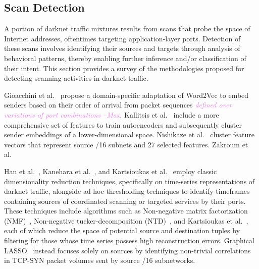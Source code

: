\documentclass[manuscript,nonacm]{acmart}
\newcommand{\maxnote}[1]{\textit{\textcolor{violet}{#1 --Max}}}
\begin{document}

\label{sec:methods:scan}
\subsection{Scan Detection}

A portion of darknet traffic mixtures results from scans that probe the space of Internet addresses, oftentimes targeting application-layer ports.
Detection of these scans involves identifying their sources and targets through analysis of behavioral patterns, thereby enabling further inference and/or classification of their intent.
This section provides a survey of the methodologies proposed for detecting scanning activities in darknet traffic. 

Gioacchini et al.~\cite{2021gioacchini,2023gioacchini} propose a domain-specific adaptation of Word2Vec to embed senders based on their order of arrival from packet sequences \maxnote{defined over variations of port combinations}.
Kallitsis et al.~\cite{2022kallitsis} include a more comprehensive set of features to train autoencoders and subsequently cluster sender embeddings of a lower-dimensional space. 
Nishikaze et al.~\cite{2015nishikaze} cluster feature vectors that represent source /16 subnets and 27 selected features.
Zakroum et al.~\cite{2023zakroum} 

\vspace{0.25em}
\noindent{\textbf{}}
Han et al.~\cite{2020han,2021han}, Kanehara et al.~\cite{2019kanehara}, and Kartsioukas et al.~\cite{2023kartsioukas} employ classic dimensionality reduction techniques, specifically on time-series representations of darknet traffic, 
alongside ad-hoc thresholding techniques to identify timeframes containing sources of coordinated scanning or targeted services by their ports.
These techniques include algorithms such as Non-negative matrix factorization (NMF)~\cite{@@}, Non-negative tucker-decomposition (NTD)~\cite{@@}, and Kartsioukas et al.~\cite{@@}, each of which reduce the space of potential source and destination tuples by filtering for those whose time series possess high reconstruction errors. 
Graphical LASSO~\cite{@@} instead focuses solely on sources by identifying non-trivial correlations in TCP-SYN packet volumes sent by source /16 subnetworks.
\end{document}
